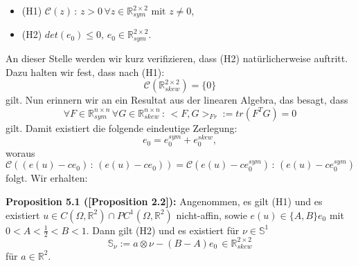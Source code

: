 \begin{itemize}
    \item (H1) \(\mathcal{C}(z) \, : \, z > 0 \, \forall z \in \mathbb{R}^{2 \times 2}_{sym} \text{ mit } z \neq 0\),
    \item (H2) \(det(e_0) \leq 0, \, e_0 \in \mathbb{R}^{2 \times 2}_{sym}\).
\end{itemize}
An dieser Stelle werden wir kurz verifizieren, dass (H2) natürlicherweise auftritt. Dazu halten wir fest, dass nach (H1):
\begin{equation}
    \mathcal{C}(\mathbb{R}^{2 \times 2}_{skew}) = \{0\}
\end{equation}
gilt. Nun erinnern wir an ein Resultat aus der linearen Algebra, das besagt, dass
\begin{equation}
    \forall F \in \mathbb{R}^{n \times n}_{sym} \, \forall G \in \mathbb{R}^{n \times n}_{skew} \, : \, <F,G>_{Fr} := tr(F^T G) = 0
\end{equation}
gilt.
Damit existiert die folgende eindeutige Zerlegung:
\begin{equation}
    e_0 = e^{sym}_0 + e^{skew}_0,
\end{equation}
woraus
\begin{equation}
    \mathcal{C}((e(u) - ce_0) \, : \, (e(u) - ce_0)) = \mathcal{C}(e(u) - ce^{sym}_0) \, : \, (e(u) - ce^{sym}_0)
\end{equation}
folgt. Wir erhalten:\\[0.5cm]
\colorbox{generalYellow}{\begin{minipage}{16cm}{\textcolor{black}{}{\label{prop5.1}}}
\textbf{Proposition 5.1 (\cite{Stinson_2021}[Proposition 2.2]):} Angenommen, es gilt (H1) und es existiert \(u \in C(\Omega,\mathbb{R}^2) \cap PC^1(\Omega,\mathbb{R}^2)\) nicht-affin, sowie \(e(u) \in \{A,B\}e_0\) mit \(0 < A < \frac{1}{2} < B < 1\). Dann gilt (H2) und es existiert für \(\nu \in \mathbb{S}^1\)
\begin{equation}
    \mathbb{S}_{\nu} := a \otimes \nu - (B-A)e_0 \, \in \mathbb{R}^{2 \times 2}_{skew}
\end{equation}
für \(a \in \mathbb{R}^2\).
\end{minipage}}

